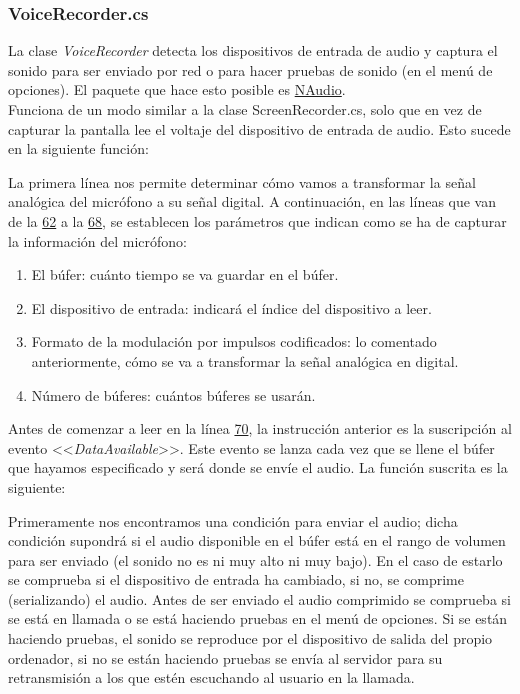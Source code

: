 \documentclass[12pt, a4paper]{book} %
\begin{document}
				\subsubsection{VoiceRecorder.cs}
				La clase \textit{VoiceRecorder} detecta los dispositivos de entrada de audio y captura el sonido para ser enviado por red o para hacer pruebas de sonido (en el menú de opciones). El paquete que hace esto posible es \hyperlink{naudio}{NAudio}.\\
				Funciona de un modo similar a la clase ScreenRecorder.cs, solo que en vez de capturar la pantalla lee el voltaje del dispositivo de entrada de audio. Esto sucede en la siguiente función:
				
				La primera línea nos permite determinar cómo vamos a transformar la señal analógica del micrófono a su señal digital. A continuación, en las líneas que van de la \hyperlink{../Baco/Recorder/VoiceRecorder.cs62}{62} a la \hyperlink{../Baco/Recorder/VoiceRecorder.cs68}{68}, se establecen los parámetros que indican como se ha de capturar la información del micrófono:
				\begin{enumerate}
					\item El búfer: cuánto tiempo se va guardar en el búfer.
					\item El dispositivo de entrada: indicará el índice del dispositivo a leer.
					\item Formato de la modulación por impulsos codificados: lo comentado anteriormente, cómo se va a transformar la señal analógica en digital.
					\item Número de búferes: cuántos búferes se usarán.
				\end{enumerate}
				Antes de comenzar a leer en la línea \hyperlink{../Baco/Recorder/VoiceRecorder.cs70}{70}, la instrucción anterior es la suscripción al evento <<\textit{DataAvailable}>>. Este evento se lanza cada vez que se llene el búfer que hayamos especificado y será donde se envíe el audio. La función suscrita es la siguiente:
				
				Primeramente nos encontramos una condición para enviar el audio; dicha condición supondrá si el audio disponible en el búfer está en el rango de volumen para ser enviado (el sonido no es ni muy alto ni muy bajo). En el caso de estarlo se comprueba si el dispositivo de entrada ha cambiado, si no, se comprime (serializando) el audio. Antes de ser enviado el audio comprimido se comprueba si se está en llamada o se está haciendo pruebas en el menú de opciones. Si se están haciendo pruebas, el sonido se reproduce por el dispositivo de salida del propio ordenador, si no se están haciendo pruebas se envía al servidor para su retransmisión a los que estén escuchando al usuario en la llamada.
\end{document}
